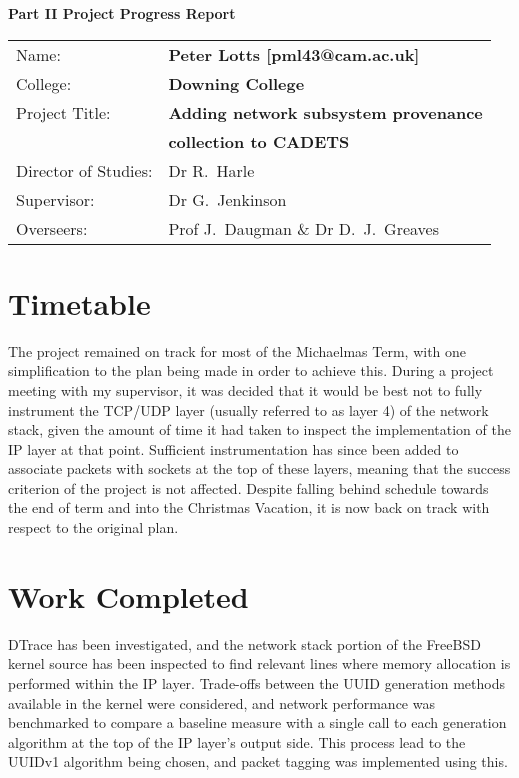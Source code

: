 \documentclass[a4paper,12pt,twoside,openright]{report}
\begin{document}
	{\LARGE \textbf{Part II Project Progress Report}}
	
	\vspace*{10mm}
	
	{\large
		\begin{tabular}{ll}
			Name:               & \bf Peter Lotts [pml43@cam.ac.uk]  	\\
			College:            & \bf Downing College               	\\
			Project Title:      & \bf Adding network subsystem provenance \\
								& \bf collection to CADETS 				\\
			Director of Studies:& Dr R.~Harle                   	 	\\
			Supervisor:         & Dr G.~Jenkinson                    	\\ 
			Overseers:         	& Prof J.~Daugman \& Dr D.~J.~Greaves  	\\
		\end{tabular}
	}

	\vspace*{10mm}
	\setcounter{secnumdepth}{0}

	\section{Timetable}
	
	The project remained on track for most of the Michaelmas Term, with one simplification to the plan being made in order to achieve this. During a project meeting with my supervisor, it was decided that it would be best not to fully instrument the TCP/UDP layer (usually referred to as layer 4) of the network stack, given the amount of time it had taken to inspect the implementation of the IP layer at that point. Sufficient instrumentation has since been added to associate packets with sockets at the top of these layers, meaning that the success criterion of the project is not affected. Despite falling behind schedule towards the end of term and into the Christmas Vacation, it is now back on track with respect to the original plan.
	
	\section{Work Completed}
	
	DTrace has been investigated, and the network stack portion of the FreeBSD kernel source has been inspected to find relevant lines where memory allocation is performed within the IP layer. Trade-offs between the UUID generation methods available in the kernel were considered, and network performance was benchmarked to compare a baseline measure with a single call to each generation algorithm at the top of the IP layer's output side. This process lead to the UUIDv1 algorithm being chosen, and packet tagging was implemented using this.
	
\end{document}
